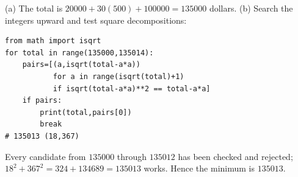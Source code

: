 (a) The total is $20000+30(500)+100000=\boxed{135000}$ dollars.
(b) Search the integers upward and test square decompositions:
\begin{verbatim}
from math import isqrt
for total in range(135000,135014):
    pairs=[(a,isqrt(total-a*a))
           for a in range(isqrt(total)+1)
           if isqrt(total-a*a)**2 == total-a*a]
    if pairs:
        print(total,pairs[0])
        break
# 135013 (18,367)
\end{verbatim}
Every candidate from $135000$ through $135012$ has been checked and rejected; $18^2+367^2=324+134689=135013$ works. Hence the minimum is $\boxed{135013}$.
